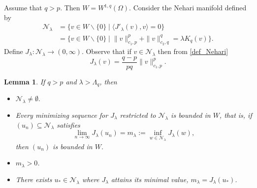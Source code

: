 \documentclass[pdflatex,sn-mathphys-num]{sn-jnl}
\theoremstyle{thmstyleone}%
\newtheorem{lem}[theorem]{Lemma}
\theoremstyle{thmstyletwo}%
\theoremstyle{thmstylethree}%
\theoremstyle{thmstylethree}%
\begin{document}
Assume that  $q>p$.  Then $W=W^{1,q}(\Omega)$.
Consider the Nehari manifold defined by
\begin{align}\label{def_Nehari}\mathcal{N}_{\lambda}&=\{v\in W\backslash\{0\}\;|\;\langle J'_\lambda (v),v\rangle=0\}\nonumber\\
    &=\{v\in W\backslash\{0\}\;|\; \|v \|_{c_1,p}^p+\|v \|_{c_2,q}^q=\lambda K_q(v)\}.
\end{align}
Define $J_{\lambda}:  \mathcal{N}_{\lambda}\to (0,\infty) $.
 Observe that if $v\in \mathcal{N}_{\lambda}$ then from \eqref{def_Nehari}  
\begin{equation}\label{J_rest_eta}
    J_{\lambda}(v)=\frac{q-p}{pq}\|v \|_{c_1,p}^p.
\end{equation}
\begin{lem}\label{2-exist-eigen}
     If $q>p$ and $\lambda>\Lambda_q$, then
     \begin{itemize}
         \item[(i)] $ \mathcal{N}_{\lambda}\neq \emptyset.$
         \item[(ii)] Every minimizing sequence  for $J_{\lambda}$ restricted to $\mathcal{N}_{\lambda}$ is bounded in $W$, that is, if $\left(u_{n}\right) \subseteq \mathcal{N}_{\lambda}$ satisfies 
\begin{equation}\label{Jlambda}
\lim_{n\to \infty} J_\lambda (u_n) = m_{\lambda} :=\inf _{w \in \mathcal{N}_{\lambda}} J_{\lambda}(w), 
\end{equation}
then $(u_n)$ is bounded in $W$.
         \item[(iii)]  $m_{\lambda}>0$.
         \item[(iv)] 
     There exists $u_{*} \in \mathcal{N}_{\lambda}$ where ${J}_{\lambda}$ attains its minimal value, $\displaystyle {m_{\lambda}=J_{\lambda}(u_*)}$.
     \end{itemize}
     
\end{lem}
\end{document}
